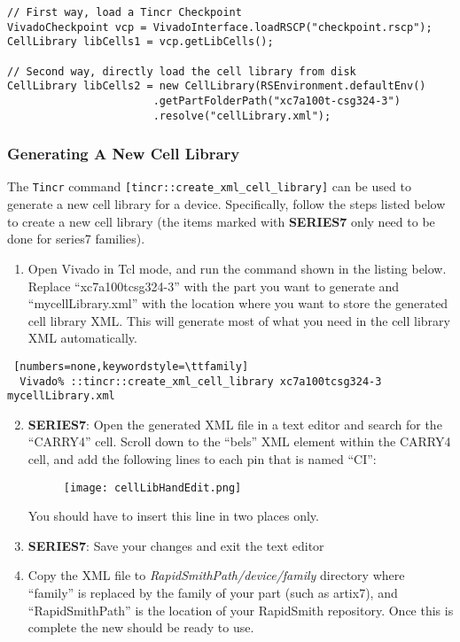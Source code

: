 \begin{lstlisting}[xleftmargin=1.5em, framexleftmargin=1.5em, caption=
Loading a CellLibrary in RapidSmith2, label=code:cellLibrary] 
// First way, load a Tincr Checkpoint
VivadoCheckpoint vcp = VivadoInterface.loadRSCP("checkpoint.rscp");
CellLibrary libCells1 = vcp.getLibCells();

// Second way, directly load the cell library from disk
CellLibrary libCells2 = new CellLibrary(RSEnvironment.defaultEnv()
                       .getPartFolderPath("xc7a100t-csg324-3")
                       .resolve("cellLibrary.xml");
\end{lstlisting} 

\subsubsection{Generating A New Cell Library} \label{sec:cellLibraryGeneration}
The \texttt{Tincr} command \texttt{[tincr::create\_xml\_cell\_library]} can be
used to generate a new cell library for a device. Specifically, follow the steps
listed below to create a new cell library (the items marked with
\textbf{SERIES7} only need to be done for series7 families).

\begin{enumerate}
  \item Open Vivado in Tcl mode, and run the command shown in the listing below.
  Replace ``xc7a100tcsg324-3'' with the part you want to generate and
  ``mycellLibrary.xml'' with the location where you want to store the generated
  cell library XML. This will generate most of what you need in the cell
  library XML automatically.
\end{enumerate}

  \begin{lstlisting} [numbers=none,keywordstyle=\ttfamily]
  Vivado% ::tincr::create_xml_cell_library xc7a100tcsg324-3 mycellLibrary.xml
  \end{lstlisting}

\begin{enumerate}
 \setcounter{enumi}{1} 
  \item \textbf{SERIES7}: Open the generated XML file in a text editor and
  search for the ``CARRY4'' cell. Scroll down to the ``bels'' XML element within
  the CARRY4 cell, and add the following lines to each pin that is named ``CI'':
  
  \begin{figure}[H]
   \centering
   \texttt{[image: cellLibHandEdit.png]}
  \end{figure}
  
  You should have to insert this line in two places only.
  \item \textbf{SERIES7}: Save your changes and exit the text editor
  \item Copy the XML file to \textit{RapidSmithPath/device/family}
  directory where ``family'' is replaced by the family of your part (such as
  artix7), and ``RapidSmithPath'' is the location of your RapidSmith repository.
  Once this is complete the new  should be ready to use. 
\end{enumerate}

